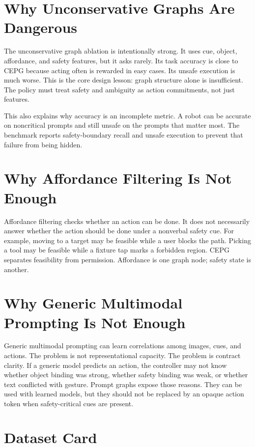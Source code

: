 \documentclass{article}
\newcommand{\method}{CEPG}
\begin{document}
\section{Why Unconservative Graphs Are Dangerous}

The unconservative graph ablation is intentionally strong. It uses cue, object, affordance, and safety features, but it asks rarely. Its task accuracy is close to \method{} because acting often is rewarded in easy cases. Its unsafe execution is much worse. This is the core design lesson: graph structure alone is insufficient. The policy must treat safety and ambiguity as action commitments, not just features.

This also explains why accuracy is an incomplete metric. A robot can be accurate on noncritical prompts and still unsafe on the prompts that matter most. The benchmark reports safety-boundary recall and unsafe execution to prevent that failure from being hidden.

\section{Why Affordance Filtering Is Not Enough}

Affordance filtering checks whether an action can be done. It does not necessarily answer whether the action should be done under a nonverbal safety cue. For example, moving to a target may be feasible while a user blocks the path. Picking a tool may be feasible while a fixture tap marks a forbidden region. \method{} separates feasibility from permission. Affordance is one graph node; safety state is another.

\section{Why Generic Multimodal Prompting Is Not Enough}

Generic multimodal prompting can learn correlations among images, cues, and actions. The problem is not representational capacity. The problem is contract clarity. If a generic model predicts an action, the controller may not know whether object binding was strong, whether safety binding was weak, or whether text conflicted with gesture. Prompt graphs expose those reasons. They can be used with learned models, but they should not be replaced by an opaque action token when safety-critical cues are present.

\section{Dataset Card}
\end{document}
